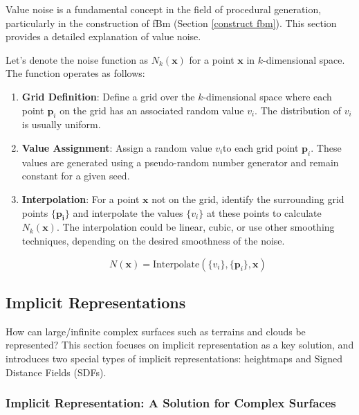 Value noise is a fundamental concept in the field of procedural generation, particularly in the construction of fBm (Section \ref{construct fbm}). This section provides a detailed explanation of value noise.

Let's denote the noise function as $N_k(\mathbf{x})$ for a point $\mathbf{x}$ in $k$-dimensional space. The function operates as follows:

\begin{enumerate}
    \item \textbf{Grid Definition}: Define a grid over the $k$-dimensional space where each point $\mathbf{p}_i$ on the grid has an associated random value $v_i$. The distribution of $v_i$is usually uniform.

    \item \textbf{Value Assignment}: Assign a random value $v_i$to each grid point $\mathbf{p}_i$. These values are generated using a pseudo-random number generator and remain constant for a given seed.

    \item \textbf{Interpolation}: For a point $\mathbf{x}$ not on the grid, identify the surrounding grid points $\{\mathbf{p_{i}\}}$ and interpolate the values $\{v_i\}$ at these points to calculate $N_k(\mathbf{x})$. The interpolation could be linear, cubic, or use other smoothing techniques, depending on the desired smoothness of the noise.
    
    \begin{equation}
        N(\mathbf{x}) = \text{Interpolate}(\{v_i\}, \{\mathbf{p}_i\}, \mathbf{x}) 
    \end{equation}
\end{enumerate}


\subsection{Implicit Representations}

How can large/infinite complex surfaces such as terrains and clouds be represented? This section focuses on implicit representation as a key solution, and introduces two special types of  implicit representations: heightmaps and Signed Distance Fields (SDFs).

\subsubsection{Implicit Representation: A Solution for Complex Surfaces}

